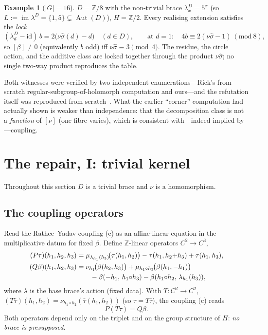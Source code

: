 \documentclass[11pt,reqno]{amsart}
\theoremstyle{plain}
\theoremstyle{definition}
\newtheorem{example}[theorem]{Example}
\newcommand{\Z}{\mathbb{Z}}
\newcommand{\id}{\mathrm{id}}
\newcommand{\im}{\operatorname{im}}
\newcommand{\Aut}{\operatorname{Aut}}
\newcommand{\shat}{\widehat{\sigma}}
\newcommand{\lD}{\lambda^{D}}
\begin{document}
\begin{example}[$|G|=16$]\label{ex:g16}
$D=\Z/8$ with the non-trivial brace $\lD_x=5^x$ (so
$L:=\im\lD=\{1,5\}\subsetneq\Aut(D)$), $H=\Z/2$. Every realising extension satisfies the
\emph{lock}
\begin{equation}\label{eq:lock-intro}
(\lD_d-\id)\,b=2\big(\nu\shat(d)-d\big)\quad(d\in D),\qquad\text{at }d=1:\quad
4b\equiv 2(\nu\shat-1)\ (\mathrm{mod}\ 8),
\end{equation}
so $[\beta]\ne0$ (equivalently $b$ odd) iff $\nu\shat\equiv3\pmod4$. The residue, the
circle action, and the additive class are locked together through the product $\nu\shat$;
no single two-way product reproduces the table.
\end{example}

Both witnesses were verified by two independent enumerations---Rick's from-scratch
regular-subgroup-of-holomorph computation and ours---and the refutation itself was
reproduced from scratch~\cite{RickRef}. What the earlier ``corner'' computation had
actually shown is weaker than independence: that the decomposition class is not a
\emph{function} of $[\nu]$ (one fibre varies), which is consistent with---indeed implied
by---coupling.

\section{The repair, I: trivial kernel}\label{sec:repairI}

Throughout this section $D$ is a trivial brace and $\nu$ is a homomorphism.

\subsection{The coupling operators}
Read the Rathee--Yadav coupling (c) as an affine-linear equation in the multiplicative
datum for fixed $\beta$. Define $\Z$-linear operators $C^2\to C^3$,
\begin{align}
(P\tau)(h_1,h_2,h_3)&=\mu_{\lambda_{h_1}(h_3)}\!\big(\tau(h_1,h_2)\big)-\tau(h_1,h_2{+}h_3)+\tau(h_1,h_3),\label{eq:P}\\
(Q\beta)(h_1,h_2,h_3)&=\nu_{h_1}\!\big(\beta(h_2,h_3)\big)+\mu_{h_1\circ h_3}\!\big(\beta(h_1,-h_1)\big)\notag\\
&\qquad{}-\beta(-h_1,\,h_1{\circ}h_3)-\beta(h_1{\circ}h_2,\,\lambda_{h_1}(h_3)),\label{eq:Q}
\end{align}
where $\lambda$ is the base brace's action (fixed data). With
$T\colon C^2\to C^2$, $(T\bar\tau)(h_1,h_2)=\nu_{h_1\circ h_2}(\bar\tau(h_1,h_2))$ (so
$\tau=T\bar\tau$), the coupling (c) reads
\begin{equation}\label{eq:coupling}
P(T\bar\tau)=Q\beta.
\end{equation}
Both operators depend only on the triplet and on the group structure of $H$: \emph{no brace
is presupposed}.
\end{document}

